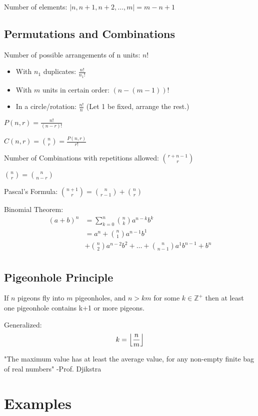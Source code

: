 \documentclass[landscape, letterpaper, 8pt]{extarticle}
\DeclarePairedDelimiter{\floor}{\lfloor}{\rfloor}
\begin{document}
\begin{multicols}{3}
    Number of elements: $|{n, n+1, n+2, \ldots, m}| = m - n + 1$
    \subsection*{Permutations and Combinations}
    Number of possible arrangements of n units: $n!$
    \begin{itemize}[noitemsep,nolistsep]
        \item With $n_1$ duplicates: $\frac{n!}{n_1!}$
        \item With $m$ units in certain order: $(n-(m-1))!$
        \item In a circle/rotation: $\frac{n!}{n}$ (Let 1 be fixed, arrange the rest.)
    \end{itemize}

    $P(n, r) = \frac{n!}{(n-r)!}$

    $C(n, r) = \binom{n}{r} = \frac{P(n, r)}{r!}$

    Number of Combinations with repetitions allowed: $\binom{r+n-1}{r}$

    $\binom{n}{r} = \binom{n}{n-r}$

    Pascal's Formula: $\binom{n+1}{r} = \binom{n}{r-1}+ \binom{n}{r}$

    Binomial Theorem:\begin{align*}
        (a+b)^n & = \sum_{k=0}^n\binom{n}{k} a^{n-k}b^k                                  \\
                & = a^n + \binom{n}{1} a^{n-1} b^1                                       \\
                & + \binom{n}{2} a^{n-2} b^2 + \ldots + \binom{n}{n-1} a^1 b^{n-1} + b^n \\
    \end{align*}
    \subsection*{Pigeonhole Principle}
    If $n$ pigeons fly into $m$ pigeonholes, and $n > km$ for some $k \in \mathbb{Z}^+$ then at least one pigeonhole contains k+1 or more pigeons.

    Generalized: \[k = \floor*{\frac{n}{m}}\]

    "The maximum value has at least the average value, for any non-empty finite bag of real numbers" -Prof. Djikstra
    \section*{Examples}
    \newtheorem{example}{Example}

\end{multicols}
\end{document}
